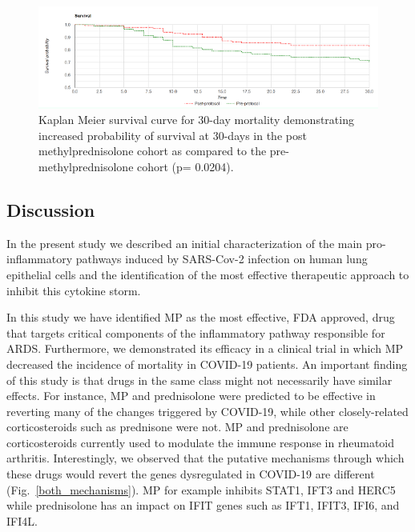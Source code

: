 \begin{figure}
\centering
	\includegraphics[width=1\linewidth]{../Figures/Survival_methylprednisolone.png}
        \caption{Kaplan Meier survival curve for 30-day mortality demonstrating increased probability of survival at 30-days in the post methylprednisolone cohort as compared to the pre-methylprednisolone cohort (p= 0.0204).  }
        \label{survival}
\end{figure}



\subsection{Discussion}

In the present study we described an initial characterization of the main pro-inflammatory pathways induced by SARS-Cov-2 infection on human lung epithelial cells and the identification of the most effective therapeutic approach to inhibit this cytokine storm.


In this study we have identified MP as the most effective, FDA approved, drug that targets critical components of the inflammatory pathway responsible for ARDS.  Furthermore, we demonstrated its efficacy  in a clinical trial in which MP decreased the incidence of mortality in COVID-19 patients. An important finding of this study is that drugs in the same class might not necessarily have similar effects. For instance, MP and prednisolone were predicted to be effective in reverting many of the changes triggered by COVID-19, while other closely-related corticosteroids such as prednisone were not. MP and prednisolone are corticosteroids currently used to modulate the immune response in rheumatoid arthritis. Interestingly, we observed that the putative mechanisms through which these drugs would revert the genes dysregulated in COVID-19 are different (Fig.~\ref{both_mechanisms}). MP for example inhibits STAT1, IFT3 and HERC5 while prednisolone has an impact on IFIT genes such as IFT1, IFIT3, IFI6, and IFI4L.

